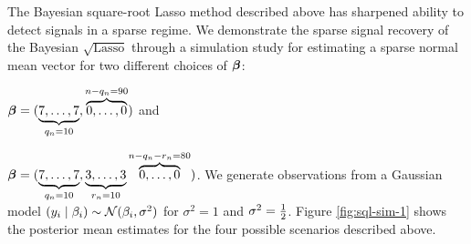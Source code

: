 \documentclass[11pt]{article}
\begin{document}
The Bayesian square-root Lasso method described above has sharpened ability to detect signals in a sparse regime. We demonstrate the sparse signal recovery of the Bayesian $\sqrt{\text{Lasso}}$ through a simulation study for estimating a sparse normal mean vector for two different choices of $\boldsymbol{\beta}$: 
\ben
\item $\boldsymbol{\beta} = (\underbrace{7,\ldots,7}_{q_n=10},\overbrace{0,\ldots,0}^{n-q_n = 90})$ and 
\item $\boldsymbol{\beta} = (\underbrace{7,\ldots,7}_{q_{n}=10},\underbrace{3,\ldots,3}_{r_n=10}\overbrace{0,\ldots,0}^{n-q_n-r_n = 80})$.
\een
We generate observations from a Gaussian model $(y_i \mid \beta_i) \sim \mathcal{N}(\beta_i, \sigma^2)$ for $\sigma^2 = 1$ and $\sigma^2 = \frac{1}{2}$. Figure \ref{fig:sql-sim-1} shows the posterior mean estimates for the four possible scenarios described above. 

%



\end{document}

